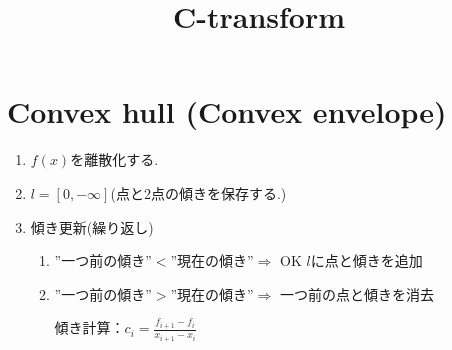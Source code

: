 \documentclass{jsarticle}
\theoremstyle{definition}
\begin{document}
\title{C-transform}

\maketitle

\section{Convex hull (Convex envelope)}


\begin{enumerate}
   \item $f(x)$を離散化する.
   \item $l = [0, - \infty ]$(点と2点の傾きを保存する.) 
   \item 傾き更新(繰り返し)
   \begin{enumerate}
   	\item ''一つ前の傾き''$ < $''現在の傾き''$\Rightarrow$ OK $l$に点と傾きを追加
   	\item ''一つ前の傾き''$ > $''現在の傾き''$\Rightarrow$ 一つ前の点と傾きを消去
   	
   	傾き計算：$c_i = \tfrac{f_{i+1} - f_i}{x_{i+1}- x_i}$
   \end{enumerate}
\end{enumerate}
\end{document}
